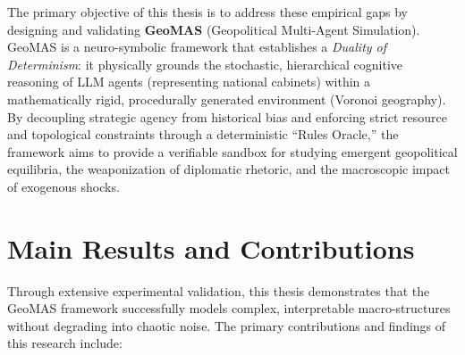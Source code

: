 The primary objective of this thesis is to address these empirical gaps by designing and validating \textbf{GeoMAS} (Geopolitical Multi-Agent Simulation). GeoMAS is a neuro-symbolic framework that establishes a \textit{Duality of Determinism}: it physically grounds the stochastic, hierarchical cognitive reasoning of LLM agents (representing national cabinets) within a mathematically rigid, procedurally generated environment (Voronoi geography). By decoupling strategic agency from historical bias and enforcing strict resource and topological constraints through a deterministic ``Rules Oracle,'' the framework aims to provide a verifiable sandbox for studying emergent geopolitical equilibria, the weaponization of diplomatic rhetoric, and the macroscopic impact of exogenous shocks.

\section{Main Results and Contributions}
\label{sec:intro_results}
Through extensive experimental validation, this thesis demonstrates that the GeoMAS framework successfully models complex, interpretable macro-structures without degrading into chaotic noise. The primary contributions and findings of this research include:

